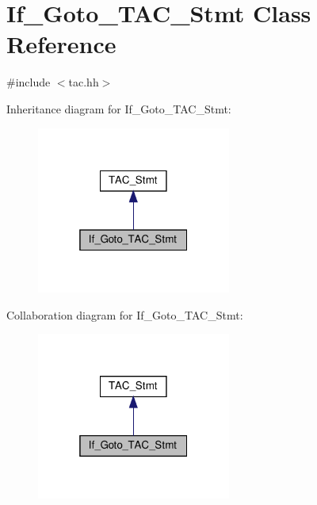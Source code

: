 \hypertarget{classIf__Goto__TAC__Stmt}{}\section{If\+\_\+\+Goto\+\_\+\+T\+A\+C\+\_\+\+Stmt Class Reference}
\label{classIf__Goto__TAC__Stmt}


{\ttfamily \#include $<$tac.\+hh$>$}



Inheritance diagram for If\+\_\+\+Goto\+\_\+\+T\+A\+C\+\_\+\+Stmt\+:
\nopagebreak
\begin{figure}[H]
\begin{center}
\leavevmode
\includegraphics[width=181pt]{classIf__Goto__TAC__Stmt__inherit__graph}
\end{center}
\end{figure}


Collaboration diagram for If\+\_\+\+Goto\+\_\+\+T\+A\+C\+\_\+\+Stmt\+:
\nopagebreak
\begin{figure}[H]
\begin{center}
\leavevmode
\includegraphics[width=181pt]{classIf__Goto__TAC__Stmt__coll__graph}
\end{center}
\end{figure}
